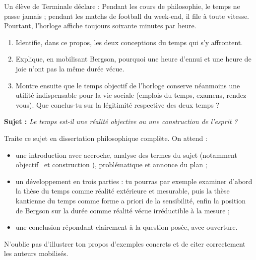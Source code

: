 \documentclass[11pt]{article}
\newcommand{\cle}[1]{{\popxbold\color{popdark}#1}}
\newcounter{popsec}
\newcounter{popsub}
\newcommand{\courssub}[1]{%
  \stepcounter{popsub}%
  \par\vspace{9pt}\noindent{\popxbold\fontsize{11.5}{13}\selectfont\color{popink}{\color{poporange}\thepopsec.\thepopsub}\hspace{6pt}#1}\par\nopagebreak\vspace{4pt}
}
\begin{document}
\begin{exercice}
Un élève de Terminale déclare : \guillemotleft Pendant les cours de philosophie, le temps ne passe jamais ; pendant les matchs de football du week-end, il file à toute vitesse. Pourtant, l'horloge affiche toujours soixante minutes par heure. \guillemotright

\begin{enumerate}
\item Identifie, dans ce propos, les deux conceptions du temps qui s'y affrontent.
\item Explique, en mobilisant Bergson, pourquoi une heure d'ennui et une heure de joie n'ont pas la même \cle{durée} vécue.
\item Montre ensuite que le temps objectif de l'horloge conserve néanmoins une utilité indispensable pour la vie sociale (emplois du temps, examens, rendez-vous). Que conclus-tu sur la légitimité respective des deux temps ?
\end{enumerate}
\end{exercice}

\courssub{Je me prépare au Bac}

\begin{exercice}
\textbf{Sujet :} \emph{Le temps est-il une réalité objective ou une construction de l'esprit ?}

Traite ce sujet en dissertation philosophique complète. On attend :
\begin{itemize}
\item une introduction avec accroche, analyse des termes du sujet (notamment \guillemotleft objectif \guillemotright\ et \guillemotleft construction \guillemotright), problématique et annonce du plan ;
\item un développement en trois parties : tu pourras par exemple examiner d'abord la thèse du temps comme réalité extérieure et mesurable, puis la thèse kantienne du temps comme forme a priori de la sensibilité, enfin la position de Bergson sur la durée comme réalité vécue irréductible à la mesure ;
\item une conclusion répondant clairement à la question posée, avec ouverture.
\end{itemize}
N'oublie pas d'illustrer ton propos d'exemples concrets et de citer correctement les auteurs mobilisés.
\end{exercice}
\end{document}
